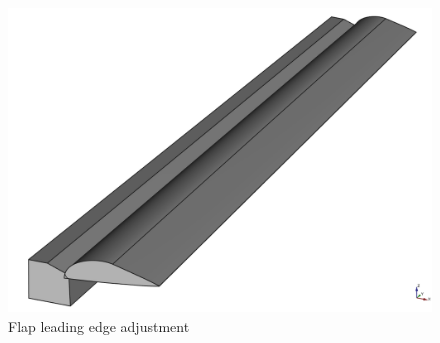%
\begin{figure}[H]
\centering
\includegraphics[scale=0.35]{Immagini/Appendice/Flap/FlapPlusFlapCuttingSolid_01}
\caption{Flap leading edge adjustment}
\label{fig:FlapLEAdjustment}
\end{figure}
%  

